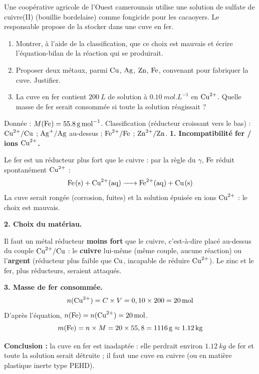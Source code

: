 \documentclass[11pt]{article}
\begin{document}
\begin{exoresolu}
Une coopérative agricole de l'Ouest camerounais utilise une solution de sulfate de cuivre(II) (bouillie bordelaise) comme fongicide pour les cacaoyers. Le responsable propose de la stocker dans une cuve en fer.
\begin{enumerate}
\item Montrer, à l'aide de la classification, que ce choix est mauvais et écrire l'équation-bilan de la réaction qui se produirait.
\item Proposer deux métaux, parmi $\ce{Cu}$, $\ce{Ag}$, $\ce{Zn}$, $\ce{Fe}$, convenant pour fabriquer la cuve. Justifier.
\item La cuve en fer contient $\SI{200}{L}$ de solution à $\SI{0,10}{mol.L^{-1}}$ en $\ce{Cu^2+}$. Quelle masse de fer serait consommée si toute la solution réagissait ?
\end{enumerate}
Donnée : $M(\ce{Fe}) = \SI{55,8}{g.mol^{-1}}$. Classification (réducteur croissant vers le bas) : $\ce{Cu^2+}/\ce{Cu}$ ; $\ce{Ag+}/\ce{Ag}$ au-dessus ; $\ce{Fe^2+}/\ce{Fe}$ ; $\ce{Zn^2+}/\ce{Zn}$.
\tcblower
\textbf{1. Incompatibilité fer / ions $\ce{Cu^2+}$.}

Le fer est un réducteur plus fort que le cuivre : par la règle du $\gamma$, $\ce{Fe}$ réduit spontanément $\ce{Cu^2+}$ :
\[ \ce{Fe(s) + Cu^2+(aq) -> Fe^2+(aq) + Cu(s)} \]
La cuve serait rongée (corrosion, fuites) et la solution épuisée en ions $\ce{Cu^2+}$ : le choix est mauvais.

\textbf{2. Choix du matériau.}

Il faut un métal réducteur \textbf{moins fort} que le cuivre, c'est-à-dire placé au-dessus du couple $\ce{Cu^2+}/\ce{Cu}$ : le \textbf{cuivre} lui-même (même couple, aucune réaction) ou l'\textbf{argent} (réducteur plus faible que $\ce{Cu}$, incapable de réduire $\ce{Cu^2+}$). Le zinc et le fer, plus réducteurs, seraient attaqués.

\textbf{3. Masse de fer consommée.}
\[ n(\ce{Cu^2+}) = C \times V = 0,10 \times 200 = \SI{20}{mol} \]
D'après l'équation, $n(\ce{Fe}) = n(\ce{Cu^2+}) = \SI{20}{mol}$.
\[ m(\ce{Fe}) = n \times M = 20 \times 55,8 = \SI{1116}{g} \approx \SI{1,12}{kg} \]

\textbf{Conclusion :} la cuve en fer est inadaptée : elle perdrait environ $\SI{1,12}{kg}$ de fer et toute la solution serait détruite ; il faut une cuve en cuivre (ou en matière plastique inerte type PEHD).
\end{exoresolu}
\end{document}
